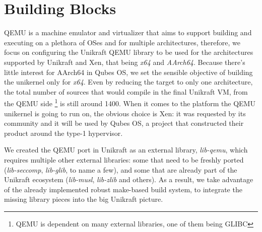 \chapter{Building Blocks}
\label{chapter:building-blocks}

QEMU \cite{qemu} is a machine emulator and virtualizer that aims to support building and executing on a plethora of OSes and for multiple architectures, therefore, we focus on configuring the Unikraft QEMU library to be used for the architectures supported by Unikraft and Xen, that being \textit{x64} and \textit{AArch64}.
Because there's little interest for AArch64 in Qubes OS, we set the sensible objective of building the unikernel only for \textit{x64}.
Even by reducing the target to only one architecture, the total number of sources that would compile in the final Unikraft VM, from the QEMU side \footnote{QEMU is dependent on many external libraries, one of them being GLIBC} is still around 1400.
When it comes to the platform the QEMU unikernel is going to run on, the obvious choice is Xen: it was requested by its community and it will be used by Qubes OS, a project that constructed their product around the type-1 hypervisor.

We created the QEMU port in Unikraft as an external library, \textit{lib-qemu}, which requires multiple other external libraries: some that need to be freshly ported (\textit{lib-seccomp}, \textit{lib-glib}, to name a few), and some that are already part of the Unikraft ecosystem (\textit{lib-musl}, \textit{lib-zlib} and others).
As a result, we take advantage of the already implemented robust make-based build system, to integrate the missing library pieces into the big Unikraft picture.
